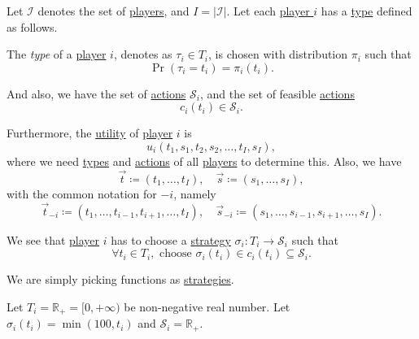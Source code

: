 \begin{definition}\label{def:mathematical-Bayesian-game}
	Let \(\mathcal{I} \) denotes the set of \hyperref[def:player]{players}, and \(I = \left\vert \mathcal{I}  \right\vert \). Let each \hyperref[def:player]{player \(i\)} has a \hyperref[def:type]{type} defined as follows.

	\begin{definition}[Type]\label{def:type}
		The \emph{type} of a \hyperref[def:player]{player} \(i\), denotes as \(\tau_{i}\in T_{i}\), is chosen with distribution
		\(\pi_i\) such that
		\[
			\Pr(\tau_{i} = t_{i}) = \pi_i(t_{i}) .
		\]
	\end{definition}

	And also, we have the set of \hyperref[def:strategy]{actions} \(\mathcal{S}_{i}\), and the set of feasible \hyperref[def:strategy]{actions}
	\[
		c_{i}(t_{i})\in \mathcal{S}_{i}.
	\]

	Furthermore, the \hyperref[def:reward]{utility} of \hyperref[def:player]{player} \(i\) is
	\[
		u_{i}(t_1, s_1, t_2, s_2, \ldots , t_I, s_I),
	\]
	where we need \hyperref[def:type]{types} and \hyperref[def:strategy]{actions} of all \hyperref[def:player]{players} to determine this. Also, we have
	\[
		\vec{t}\coloneqq (t_1, \ldots , t_I),\quad \vec{s} \coloneqq (s_1, \ldots , s_I),
	\]
	with the common notation for \(-i\), namely
	\[
		\vec{t}_{-i} \coloneqq (t_1, \ldots , t_{i-1}, t_{i+1}, \ldots , t_{I}),\quad \vec{s}_{-i} \coloneqq (s_1, \ldots , s_{i-1}, s_{i+1}, \ldots , s_{I}).
	\]

	We see that \hyperref[def:player]{player} \(i\) has to choose a \hyperref[def:strategy]{strategy} \(\sigma_{i}\colon T_{i}\to \mathcal{S}_{i}\) such that
	\[
		\forall t_{i}\in T_{i}, \text{ choose }\sigma_{i}(t_{i})\in c_{i}(t_{i})\subseteq \mathcal{S}_{i}.
	\]
\end{definition}

\begin{intuition}
	We are simply picking functions as \hyperref[def:strategy]{strategies}.
\end{intuition}

\begin{eg}
	Let \(T_{i} = \mathbb{R}_+ = [0, +\infty )\) be non-negative real number. Let
	\(\sigma_{i}(t_{i}) = \min(100, t_{i})\) and \(\mathcal{S}_{i} = \mathbb{R}_+\).
	\begin{center}
	\end{center}
\end{eg}

